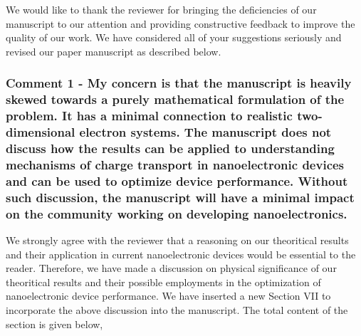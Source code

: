 \documentclass{article}
\begin{document}
We would like to thank the reviewer for bringing the deficiencies of our manuscript to our attention and providing constructive feedback to improve the quality of our work. We have considered all of your suggestions seriously and revised our paper manuscript as described below.

\subsubsection*{Comment 1 -
\color{RoyalBlue} My concern is that the manuscript is heavily skewed towards a purely mathematical formulation of the problem. It has a minimal connection to realistic two-dimensional electron systems. The manuscript does not discuss how the results can be applied to understanding mechanisms of charge transport in nanoelectronic devices and can be used to optimize device performance. Without such discussion, the manuscript will have a minimal impact on the community working on developing nanoelectronics.}

We strongly agree with the reviewer that a reasoning on our theoritical results and their application in current nanoelectronic devices would be essential to the reader. Therefore, we have made a discussion on physical significance of our theoritical results and their possible employments in the optimization of nanoelectronic device performance. We have inserted a new Section VII to incorporate the above discussion into the manuscript. The total content of the section is given below,
\end{document}
